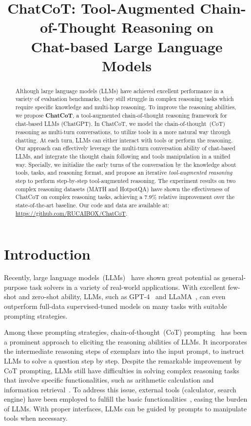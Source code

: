 \title{ChatCoT: Tool-Augmented Chain-of-Thought Reasoning on\\ Chat-based Large Language Models}



\maketitle
\begin{abstract}
Although large language models (LLMs) have achieved excellent performance in a variety of evaluation benchmarks, they still struggle in complex reasoning tasks which require specific knowledge and multi-hop reasoning.
To improve the reasoning abilities, we propose \textbf{ChatCoT}, a tool-augmented chain-of-thought reasoning framework for chat-based LLMs (\eg ChatGPT).
In ChatCoT, we model the chain-of-thought~(CoT) reasoning as multi-turn conversations, to utilize tools in a more natural way through chatting.
At each turn, LLMs can either interact with tools or perform the reasoning. 
Our approach can effectively leverage the multi-turn conversation ability of chat-based LLMs, and integrate the thought chain following and tools manipulation in a unified way. 
Specially, we initialize the early turns of the conversation by the knowledge about tools, tasks, and reasoning format, and propose an iterative \emph{tool-augmented reasoning} step to perform step-by-step tool-augmented reasoning.
The experiment results on two complex reasoning datasets (MATH and HotpotQA) have shown the effectiveness of ChatCoT on complex reasoning tasks, achieving a 7.9\% relative improvement over the state-of-the-art baseline.
Our code and data are available at:   \url{https://github.com/RUCAIBOX/ChatCoT}.
\end{abstract}

\section{Introduction}

Recently, large language models~(LLMs)~\cite{LLMsurvey} have shown great potential as general-purpose task solvers in a variety of real-world applications. 
With excellent few-shot and zero-shot ability, LLMs, such as  GPT-4~\cite{GPT-4} and LLaMA~\cite{LLaMA},  can even outperform full-data supervised-tuned models on many tasks with suitable prompting strategies. 

Among these prompting strategies, chain-of-thought~(CoT)  prompting~\cite{CoT, zero-shot-cot} has been a prominent approach to eliciting the reasoning abilities of LLMs.  
It incorporates the intermediate reasoning steps of exemplars into the input prompt, to instruct LLMs to solve a question step by step.  Despite the remarkable improvement by CoT prompting, LLMs still have difficulties in solving complex reasoning tasks that involve specific functionalities, such as arithmetic calculation and information retrieval~\cite{Lu-arxiv-2022-A, Qian-arxiv-2022-Limitations}. 
To address this issue, external tools (\eg calculator, search engine) have been employed to fulfill the basic  functionalities~\cite{Toolformer,paranjape2023art}, easing the burden of LLMs. 
With proper interfaces, LLMs can be guided by prompts to manipulate tools when necessary. 

